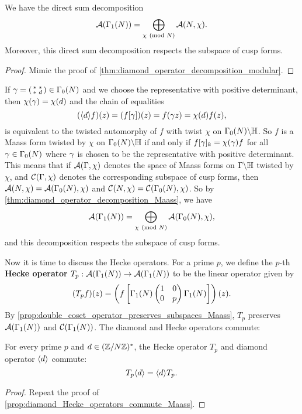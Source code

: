       \begin{proposition}\label{thm:diamond_operator_decomposition_Maass}
        We have the direct sum decomposition
        \[
          \mathcal{A}(\Gamma_{1}(N)) = \bigoplus_{\chi \ \left(\text{mod }N\right)}\mathcal{A}(N,\chi).
        \]
        Moreover, this direct sum decomposition respects the subspace of cusp forms.
      \end{proposition}
      \begin{proof}
        Mimic the proof of \cref{thm:diamond_operator_decomposition_modular}.
      \end{proof}

      If $\gamma = \begin{psmallmatrix} \ast & \ast \\ \ast & d \end{psmallmatrix} \in \Gamma_{0}(N)$ and we choose the representative with positive determinant, then $\chi(\gamma) = \chi(d)$ and the chain of equalities
      \[
        (\langle d\rangle f)(z) = (f[\gamma])(z) = f(\gamma z) = \chi(d)f(z),
      \]
      is equivalent to the twisted automorphy of $f$ with twist $\chi$ on $\Gamma_{0}(N)\backslash\mathbb{H}$. So $f$ is a Maass form twisted by $\chi$ on $\Gamma_{0}(N)\backslash\mathbb{H}$ if and only if $f[\gamma]_{k} = \chi(\gamma)f$ for all $\gamma \in \Gamma_{0}(N)$ where $\gamma$ is chosen to be the representative with positive determinant. This means that if $\mathcal{A}(\Gamma,\chi)$ denotes the space of Maass forms on $\Gamma\backslash\mathbb{H}$ twisted by $\chi$, and $\mathcal{C}(\Gamma,\chi)$ denotes the corresponding subspace of cusp forms, then $\mathcal{A}(N,\chi) = \mathcal{A}(\Gamma_{0}(N),\chi)$ and $\mathcal{C}(N,\chi) = \mathcal{C}(\Gamma_{0}(N),\chi)$. So by \cref{thm:diamond_operator_decomposition_Maass}, we have
      \[
        \mathcal{A}(\Gamma_{1}(N)) = \bigoplus_{\chi \ \left(\text{mod }N\right)}\mathcal{A}(\Gamma_{0}(N),\chi),
      \]
      and this decomposition respects the subspace of cusp forms.
      
      Now it is time to discuss the Hecke operators. For a prime $p$, we define the $p$-th \textbf{Hecke operator} $T_{p}:\mathcal{A}(\Gamma_{1}(N)) \to \mathcal{A}(\Gamma_{1}(N))$ to be the linear operator given by
      \[
        (T_{p}f)(z) = \left(f\left[\Gamma_{1}(N)\begin{pmatrix} 1 & 0 \\ 0 & p \end{pmatrix}\Gamma_{1}(N)\right]\right)(z).
      \]
      By \cref{prop:double_coset_operator_preserves_subspaces_Maass}, $T_{p}$ preserves $\mathcal{A}(\Gamma_{1}(N))$ and $\mathcal{C}(\Gamma_{1}(N))$. The diamond and Hecke operators commute:

      \begin{proposition}\label{prop:diamond_Hecke_operators_commute_Maass}
        For every prime $p$ and $d \in (\mathbb{Z}/N\mathbb{Z})^{\ast}$, the Hecke operator $T_{p}$ and diamond operator $\langle d\rangle$ commute:
        \[
          T_{p}\langle d\rangle = \langle d\rangle T_{p}.
        \]
      \end{proposition}
      \begin{proof}
        Repeat the proof of \cref{prop:diamond_Hecke_operators_commute_Maass}.
      \end{proof}


